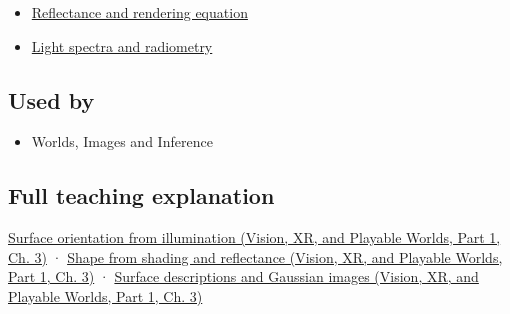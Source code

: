 \begin{itemize}
\tightlist
\item
  \hyperref[appendix-96da0b153b77]{Reflectance and rendering equation}
\item
  \hyperref[appendix-215c2570199b]{Light spectra and radiometry}
\end{itemize}

\subsection{Used by}\label{appendix-89b2d5b7c9e1-used-by}

\hypertarget{appendix-89b2d5b7c9e1-used-by}{}

\begin{itemize}
\tightlist
\item
  {Worlds, Images and Inference}
\end{itemize}

\subsection{Full teaching explanation}\label{appendix-89b2d5b7c9e1-full-teaching-explanation}

\hypertarget{appendix-89b2d5b7c9e1-full-teaching-explanation}{}

\href{../07-Vision-XR-and-Playable-Worlds-P01/main.pdf\#04-visual-computing-ii-ch032-surface-orientation-from-illumination}{Surface orientation from illumination (Vision, XR, and Playable Worlds, Part 1, Ch. 3)} · \href{../07-Vision-XR-and-Playable-Worlds-P01/main.pdf\#04-visual-computing-ii-ch032-shape-from-shading-and-reflectance}{Shape from shading and reflectance (Vision, XR, and Playable Worlds, Part 1, Ch. 3)} · \href{../07-Vision-XR-and-Playable-Worlds-P01/main.pdf\#04-visual-computing-ii-ch032-surface-descriptions-and-gaussian-images}{Surface descriptions and Gaussian images (Vision, XR, and Playable Worlds, Part 1, Ch. 3)}
